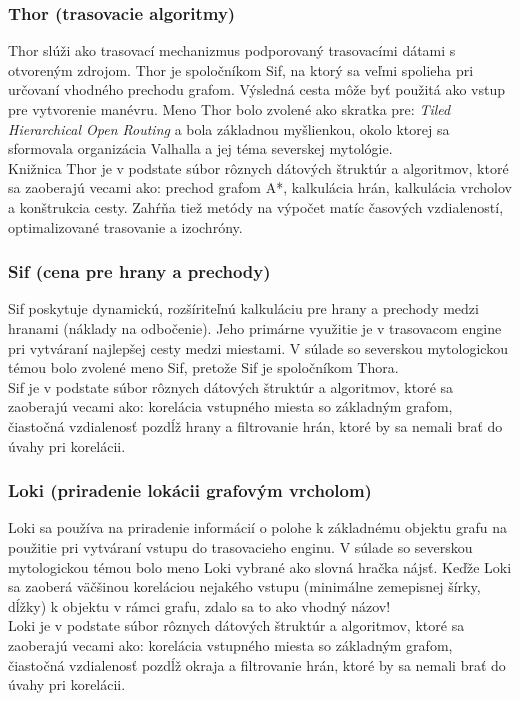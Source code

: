 \subsubsection{Thor (trasovacie algoritmy)}
Thor slúži ako trasovací mechanizmus podporovaný trasovacími dátami s otvoreným zdrojom. Thor je spoločníkom Sif, na ktorý sa veľmi spolieha pri určovaní vhodného prechodu grafom. Výsledná cesta môže byť použitá ako vstup pre vytvorenie manévru. Meno Thor bolo zvolené ako skratka pre: \textit{Tiled Hierarchical Open Routing} a bola základnou myšlienkou, okolo ktorej sa sformovala organizácia Valhalla a jej téma severskej mytológie.\\
Knižnica Thor je v podstate súbor rôznych dátových štruktúr a algoritmov, ktoré sa zaoberajú vecami ako: prechod grafom A*, kalkulácia hrán, kalkulácia vrcholov a konštrukcia cesty. Zahŕňa tiež metódy na výpočet matíc časových vzdialeností, optimalizované trasovanie a izochróny.
\subsubsection{Sif (cena pre hrany a prechody)}
Sif poskytuje dynamickú, rozšíriteľnú kalkuláciu pre hrany a prechody medzi hranami (náklady na odbočenie). Jeho primárne využitie je v trasovacom engine pri vytváraní najlepšej cesty medzi miestami. V súlade so severskou mytologickou témou bolo zvolené meno Sif, pretože Sif je spoločníkom Thora.\\
Sif je v podstate súbor rôznych dátových štruktúr a algoritmov, ktoré sa zaoberajú vecami ako: korelácia vstupného miesta so základným grafom, čiastočná vzdialenosť pozdĺž hrany a filtrovanie hrán, ktoré by sa nemali brať do úvahy pri korelácii.
\subsubsection{Loki (priradenie lokácii grafovým vrcholom)} %
Loki sa používa na priradenie informácií o polohe k základnému objektu grafu na použitie pri vytváraní vstupu do trasovacieho enginu. V súlade so severskou mytologickou témou bolo meno Loki vybrané ako slovná hračka nájsť. Keďže Loki sa zaoberá väčšinou koreláciou nejakého vstupu (minimálne zemepisnej šírky, dĺžky) k objektu v rámci grafu, zdalo sa to ako vhodný názov!\\
Loki je v podstate súbor rôznych dátových štruktúr a algoritmov, ktoré sa zaoberajú vecami ako: korelácia vstupného miesta so základným grafom, čiastočná vzdialenosť pozdĺž okraja a filtrovanie hrán, ktoré by sa nemali brať do úvahy pri korelácii.
